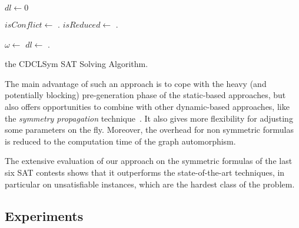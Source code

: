 \begin{algorithm}
	\DontPrintSemicolon
	
	{
		$dl \gets 0$ 
		 {
			$isConflict \gets$ \unitPropagation{}\;
			{
				\color{red} 
				\C.\notifyAssigned{\ca{}}\;
				$isReduced \gets$ \C.\isNotMinimal{\ca{}}\;
			}
			
			 {
				{
					\Return \false
				}
				{
					$\omega \gets$ \analyzeConflict{}\;
				}
				\addLearntClause{$\omega$}\;
				$dl \gets$ \backjumpPolicy{}\;
				{\color{red}\C.\notifyCancelled{\ca{}}\;}
			}
		}
		\Return \true
		
	}
	\caption{the CDCLSym SAT Solving Algorithm.}
	\label{algorithm:cdcl_cosy}
\end{algorithm}



The main advantage of such an approach is to cope with the heavy (and
potentially blocking) pre-generation phase of the static-based approaches, but
also offers opportunities to combine with other dynamic-based approaches, like
the \textit{symmetry propagation} technique~\cite{Devriendt12}. It also gives
more flexibility for adjusting some parameters on the fly. Moreover, the
overhead for non symmetric formulas is reduced to the computation time of the
graph automorphism.

The extensive evaluation of our approach on the symmetric formulas of the last
six SAT contests shows that it outperforms the state-of-the-art techniques, in
particular on unsatisfiable instances, which are the hardest class of the
problem.


\subsection{Experiments}
